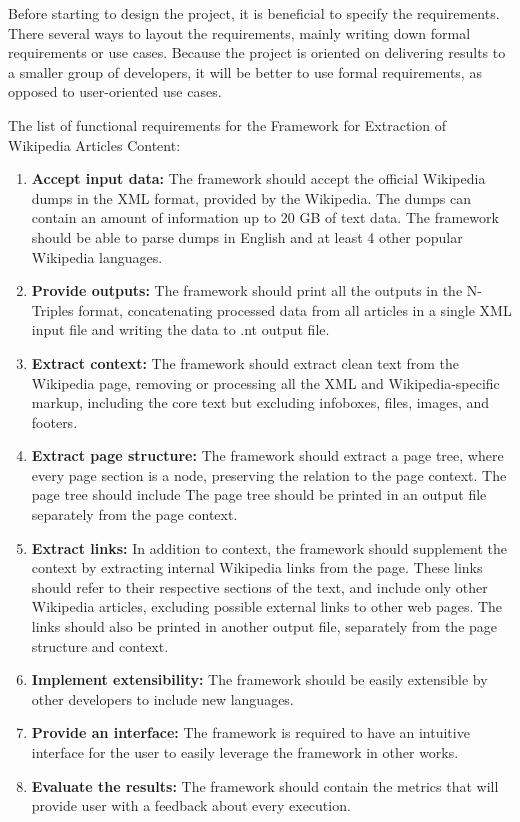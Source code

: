 \documentclass[thesis=M,english,hidelinks]{FITthesis}[2019/12/23]
\begin{document}
Before starting to design the project, it is beneficial to specify the requirements. There several ways to layout the requirements, mainly writing down formal requirements or use cases. Because the project is oriented on delivering results to a smaller group of developers, it will be better to use formal requirements, as opposed to user-oriented use cases.

The list of functional requirements for the Framework for Extraction of Wikipedia Articles Content:

\begin{enumerate}
	\item \textbf{Accept input data:} The framework should accept the official  Wikipedia dumps in the \gls{XML} format, provided by the Wikipedia. The dumps can contain an amount of information up to 20 GB of text data. The framework should be able to parse dumps in English and at least 4 other popular Wikipedia languages.
	\item \textbf{Provide outputs:} The framework should print all the outputs in the N-Triples format, concatenating processed data from all articles in a single \gls{XML} input file and writing the data to .nt output file.
	\item \textbf{Extract context:} The framework should extract clean text from the Wikipedia page, removing or processing all the \gls{XML} and Wikipedia-specific markup, including the core text but excluding infoboxes, files, images, and footers.
	\item \textbf{Extract page structure:} The framework should extract a page tree, where every page section is a node, preserving the relation to the page context. The page tree should include The page tree should be printed in an output file separately from the page context. 
	\item \textbf{Extract links:} In addition to context, the framework should supplement the context by extracting internal Wikipedia links from the page. These links should refer to their respective sections of the text, and include only other Wikipedia articles, excluding possible external links to other web pages. The links should also be printed in another output file, separately from the page structure and context.
	\item \textbf{Implement extensibility:} The framework should be easily extensible by other developers to include new languages.
	\item \textbf{Provide an interface:} The framework is required to have an intuitive interface for the user to easily leverage the framework in other works.
	\item \textbf{Evaluate the results:} The framework should contain the metrics that will provide user with a feedback about every execution.
\end{enumerate} 
\end{document}
